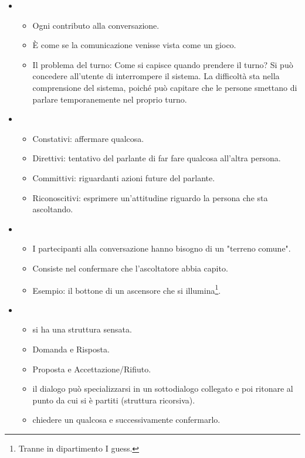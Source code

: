 \begin{itemize}
  \item {} 
    \begin{itemize}
      \item Ogni contributo alla conversazione. 
      \item È come se la comunicazione venisse vista come un gioco.  
      \item Il problema del turno: Come si capisce quando prendere il turno? Si può concedere all'utente di interrompere il sistema. La difficoltà sta nella comprensione del sistema, poiché può capitare che le persone smettano di parlare temporanemente nel proprio turno.
    \end{itemize}
  \item {}
    \begin{itemize}
      \item Constativi: affermare qualcosa.
      \item Direttivi: tentativo del parlante di far fare qualcosa all'altra persona.
      \item Committivi: riguardanti azioni future del parlante.
      \item Riconoscitivi: esprimere un'attitudine riguardo la persona che sta ascoltando.
    \end{itemize}
  \item {}
    \begin{itemize}
      \item I partecipanti alla conversazione hanno bisogno di un "terreno comune". 
      \item Consiste nel confermare che l'ascoltatore abbia capito. 
      \item Esempio: il bottone di un ascensore che si illumina\footnote{Tranne in dipartimento I guess.}.
    \end{itemize}
  \item {}
    \begin{itemize}
      \item {} si ha una struttura sensata. 
      \item Domanda e Risposta. 
      \item Proposta e Accettazione/Rifiuto.
    \item {} il dialogo può specializzarsi in un sottodialogo collegato e poi ritonare al punto da cui si è partiti (struttura ricorsiva). 
    \item {} chiedere un qualcosa e successivamente confermarlo.

\end{itemize}
\end{itemize}
